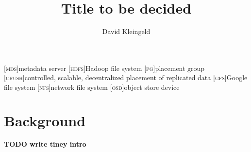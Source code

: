 \documentclass[lang=en, hanging-titles=true]{skrapport}
\title{Title to be decided}
\author{David Kleingeld}
\begin{document}
\begin{titlepage}
\maketitle
\end{titlepage}
\tableofcontents
\clearpage

\newcommand{\n}[1]{\textsc{#1}}

\begin{acronym}
	[\n{mds}]{metadata server}
	[\n{hdfs}]{Hadoop file system}
	[\n{pg}]{placement group}
	[\n{crush}]{controlled, scalable, decentralized placement of replicated data}
	[\n{gfs}]{Google file system}
	[\n{nfs}]{network file system}
	[\n{osd}]{object store device}
\end{acronym}


%
\section{Background}
\textbf{TODO write tiney intro}






%
%
%

\clearpage
\appendix
% 
\printbibliography
\end{document}
